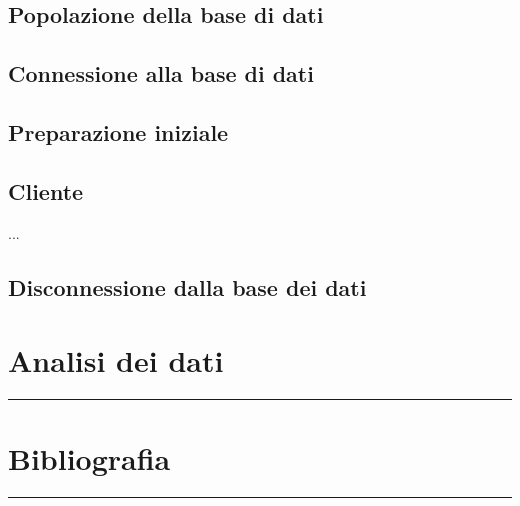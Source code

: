 \documentclass[legalpaper]{article}
\begin{document}
\subsection{Popolazione della base di dati}
\subsection{Connessione alla base di dati}
\subsection{Preparazione iniziale}
\subsection{Cliente}

...

\subsection{Disconnessione dalla base dei dati}
\newpage
\section{Analisi dei dati}
\rule{\linewidth}{1.5pt}

\newpage

\section{Bibliografia}
\rule{\linewidth}{1.5pt}
\end{document}
